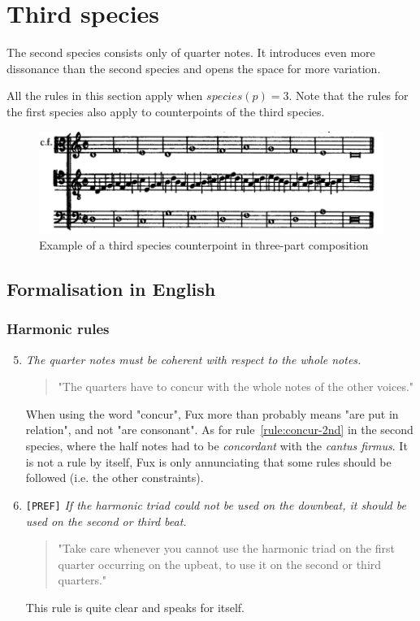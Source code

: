 \section{Third species}
The second species consists only of quarter notes. It introduces even more dissonance than the second species and opens the space for more variation. 

All the rules in this section apply when $species(p) =3$. Note that the rules for the first species also apply to counterpoints of the third species.

\begin{figure}[h]
    \centering
    \includegraphics[width=1\textwidth]{Images/Species_examples/3sp-example.png}
    \caption{Example of a third species counterpoint in three-part composition}
    \label{fig:example-3sp}
\end{figure}
\subsection{Formalisation in English}\label{formalisation-en-3rd}
\subsubsection{Harmonic rules}
\begin{enumerate}[wide, label=\bfseries 3.H\arabic*]
\setcounter{enumi}{4}
    \item \textit{The quarter notes must be coherent with respect to the whole notes.} \label{rule:concur-3rd}    
    \begin{quotation}
        "The quarters have to concur with the whole notes of the other voices."
        \textcite[p.91]{GaPEng}
    \end{quotation}
    When using the word "concur", Fux more than probably means "are put in relation", and not "are consonant". As for rule~\ref{rule:concur-2nd} in the second species, where the half notes had to be \textit{concordant} with the \textit{cantus firmus}. It is not a rule by itself, Fux is only annunciating that some rules should be followed (i.e. the other constraints).

    \item\texttt{[PREF]}  \textit{If the harmonic triad could not be used on the downbeat, it should be used on the second or third beat.} \label{rule:h-triad-3rd-sp}     
    \begin{quotation}
        "Take care whenever you cannot use the harmonic triad on the first quarter occurring on the upbeat, to use it on the second or third quarters."
        \textcite[p.91]{GaPEng}
    \end{quotation}

    This rule is quite clear and speaks for itself.
\end{enumerate}

